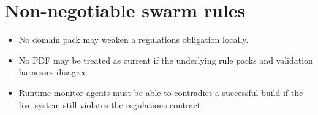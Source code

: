 \section{Non-negotiable swarm rules}

\begin{itemize}
  \item No domain pack may weaken a regulations obligation locally.
  \item No PDF may be treated as current if the underlying rule packs
    and validation harnesses disagree.
  \item Runtime-monitor agents must be able to contradict a successful
    build if the live system still violates the regulations contract.
\end{itemize}
